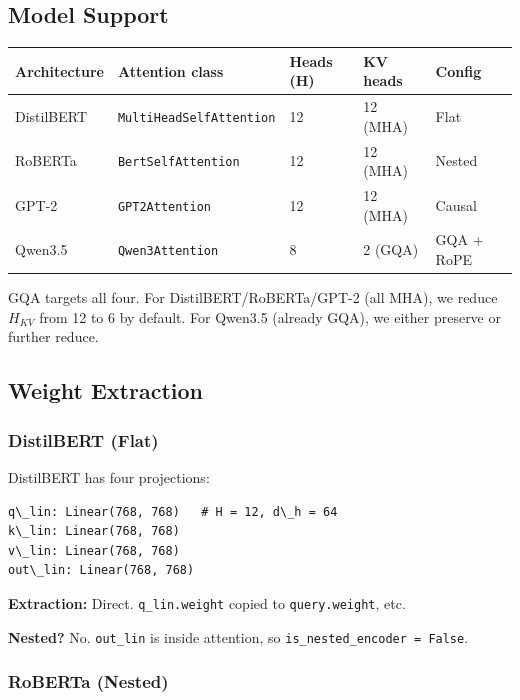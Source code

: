 \subsection{Model Support}

\begin{table}[H]
\centering
\small
\begin{tabular}{lllll}
\toprule
\textbf{Architecture} & \textbf{Attention class} & \textbf{Heads (H)} & \textbf{KV heads} & \textbf{Config} \\
\midrule
DistilBERT & \texttt{MultiHeadSelfAttention} & 12 & 12 (MHA) & Flat \\
RoBERTa & \texttt{BertSelfAttention} & 12 & 12 (MHA) & Nested \\
GPT-2 & \texttt{GPT2Attention} & 12 & 12 (MHA) & Causal \\
Qwen3.5 & \texttt{Qwen3Attention} & 8 & 2 (GQA) & GQA + RoPE \\
\bottomrule
\end{tabular}
\end{table}

GQA targets all four. For DistilBERT/RoBERTa/GPT-2 (all MHA), we reduce 
$H_{KV}$ from 12 to 6 by default. For Qwen3.5 (already GQA), we either 
preserve or further reduce.

\subsection{Weight Extraction}

\subsubsection{DistilBERT (Flat)}

DistilBERT has four projections:

\begin{lstlisting}
q\_lin: Linear(768, 768)   # H = 12, d\_h = 64
k\_lin: Linear(768, 768)
v\_lin: Linear(768, 768)
out\_lin: Linear(768, 768)
\end{lstlisting}

\textbf{Extraction:} Direct. \texttt{q\_lin.weight} copied to \texttt{query.weight}, etc.

\textbf{Nested?} No. \texttt{out\_lin} is inside attention, so \texttt{is\_nested\_encoder = False}.

\subsubsection{RoBERTa (Nested)}

